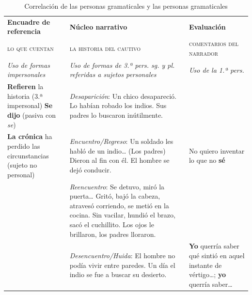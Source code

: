 \begin{table}[htbp]
  \centering
  \footnotesize
  \begin{tabularx}{\linewidth}{@{}>{\raggedright\arraybackslash}p{.24\linewidth}
                                  >{\raggedright\arraybackslash}X
                                  >{\raggedright\arraybackslash}p{.24\linewidth}@{}}
    \toprule
    \textbf{Encuadre de referencia} & \textbf{Núcleo narrativo} & \textbf{Evaluación} \\
    \textsc{lo que cuentan}          & \textsc{la historia del cautivo} & \textsc{comentarios del narrador} \\
    \textit{Uso de formas impersonales} & \textit{Uso de formas de 3.ª pers. sg. y pl. referidas a sujetos personales} & \textit{Uso de la 1.ª pers.} \\
    \midrule
    \textbf{Refieren} la historia (3.ª impersonal) \newline \textbf{Se dijo} (pasiva con \textit{se})
      & \textit{Desaparición}: Un chico desapareció. Lo habían robado los indios. Sus padres lo buscaron inútilmente.
      & \\
    \addlinespace
    \textbf{La crónica} ha perdido las circunstancias (sujeto no personal)
      & \textit{Encuentro/Regreso}: Un soldado les habló de un indio\ldots{} (Los padres) Dieron al fin con él. El hombre se dejó conducir.
      & No quiero inventar lo que no \textbf{sé} \\
    \addlinespace
      & \textit{Reencuentro}: Se detuvo, miró la puerta\ldots{} Gritó, bajó la cabeza, atravesó corriendo, se metió en la cocina. Sin vacilar, hundió el brazo, sacó el cuchillito. Los ojos le brillaron, los padres lloraron.
      & \\
    \addlinespace
      & \textit{Desencuentro/Huida}: El hombre no podía vivir entre paredes. Un día el indio se fue a buscar su desierto.
      & \textbf{Yo} querría saber qué sintió en aquel instante de vértigo\ldots; \textbf{yo} querría saber\ldots \\
    \bottomrule
  \end{tabularx}
  \caption[Correlación de las personas gramaticales]{Correlación de las
  personas gramaticales y las personas gramaticales\protect{}}\label{tab:01-cautivo}
\end{table}


